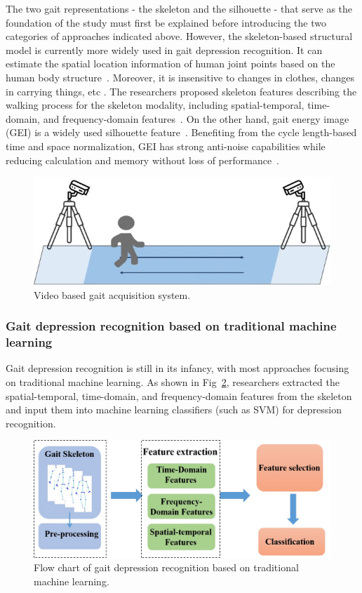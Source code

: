 The two gait representations - the skeleton and the silhouette - that serve as the foundation of the study must first be explained before introducing the two categories of approaches indicated above.
However, the skeleton-based structural model is currently more widely used in gait depression recognition.
It can estimate the spatial location information of human joint points based on the human body structure~\cite{nordin2016survey}. Moreover, it is insensitive to changes in clothes, changes in carrying things, etc \cite{wang2016gait}.
The researchers proposed skeleton features describing the walking process for the skeleton modality, including spatial-temporal, time-domain, and frequency-domain features~\cite{verlekar2019gait}.
On the other hand, gait energy image (GEI) is a widely used silhouette feature~\cite{han2005individual}.
Benefiting from the cycle length-based time and space normalization, GEI has strong anti-noise capabilities while reducing calculation and memory without loss of performance~\cite{yang2008gait}.

\begin{figure}[tbp]
\centering
\includegraphics[width=0.9\linewidth]{kinect.jpg}
\caption{Video based gait acquisition system.
}
\label{kinect}
\end{figure}


\subsubsection{Gait depression recognition based on traditional machine learning}
Gait depression recognition is still in its infancy, with most approaches focusing on traditional machine learning.
As shown in Fig~\ref{gait_traditional}, researchers extracted the spatial-temporal, time-domain, and frequency-domain features from the skeleton and input them into machine learning classifiers (such as SVM) for depression recognition.

\begin{figure}[tbp]
\centering
\includegraphics[width=0.9\linewidth]{gait_traditional.jpg}
\caption{Flow chart of gait depression recognition based on traditional machine learning.
}
\label{gait_traditional}
\end{figure}

